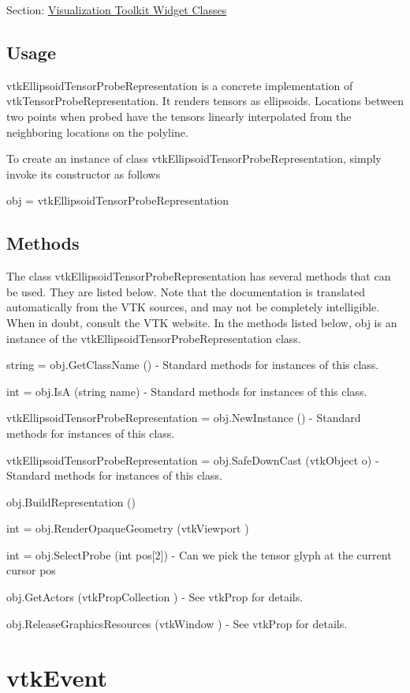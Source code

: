 Section\-: \hyperlink{sec_vtkwidgets}{Visualization Toolkit Widget Classes} \hypertarget{vtkwidgets_vtkxyplotwidget_Usage}{}\subsection{Usage}\label{vtkwidgets_vtkxyplotwidget_Usage}
vtk\-Ellipsoid\-Tensor\-Probe\-Representation is a concrete implementation of vtk\-Tensor\-Probe\-Representation. It renders tensors as ellipsoids. Locations between two points when probed have the tensors linearly interpolated from the neighboring locations on the polyline.

To create an instance of class vtk\-Ellipsoid\-Tensor\-Probe\-Representation, simply invoke its constructor as follows \begin{DoxyVerb}  obj = vtkEllipsoidTensorProbeRepresentation
\end{DoxyVerb}
 \hypertarget{vtkwidgets_vtkxyplotwidget_Methods}{}\subsection{Methods}\label{vtkwidgets_vtkxyplotwidget_Methods}
The class vtk\-Ellipsoid\-Tensor\-Probe\-Representation has several methods that can be used. They are listed below. Note that the documentation is translated automatically from the V\-T\-K sources, and may not be completely intelligible. When in doubt, consult the V\-T\-K website. In the methods listed below, {\ttfamily obj} is an instance of the vtk\-Ellipsoid\-Tensor\-Probe\-Representation class. 
\begin{DoxyItemize}
\item {\ttfamily string = obj.\-Get\-Class\-Name ()} -\/ Standard methods for instances of this class.  
\item {\ttfamily int = obj.\-Is\-A (string name)} -\/ Standard methods for instances of this class.  
\item {\ttfamily vtk\-Ellipsoid\-Tensor\-Probe\-Representation = obj.\-New\-Instance ()} -\/ Standard methods for instances of this class.  
\item {\ttfamily vtk\-Ellipsoid\-Tensor\-Probe\-Representation = obj.\-Safe\-Down\-Cast (vtk\-Object o)} -\/ Standard methods for instances of this class.  
\item {\ttfamily obj.\-Build\-Representation ()}  
\item {\ttfamily int = obj.\-Render\-Opaque\-Geometry (vtk\-Viewport )}  
\item {\ttfamily int = obj.\-Select\-Probe (int pos\mbox{[}2\mbox{]})} -\/ Can we pick the tensor glyph at the current cursor pos  
\item {\ttfamily obj.\-Get\-Actors (vtk\-Prop\-Collection )} -\/ See vtk\-Prop for details.  
\item {\ttfamily obj.\-Release\-Graphics\-Resources (vtk\-Window )} -\/ See vtk\-Prop for details.  
\end{DoxyItemize}\hypertarget{vtkwidgets_vtkevent}{}\section{vtk\-Event}\label{vtkwidgets_vtkevent}
